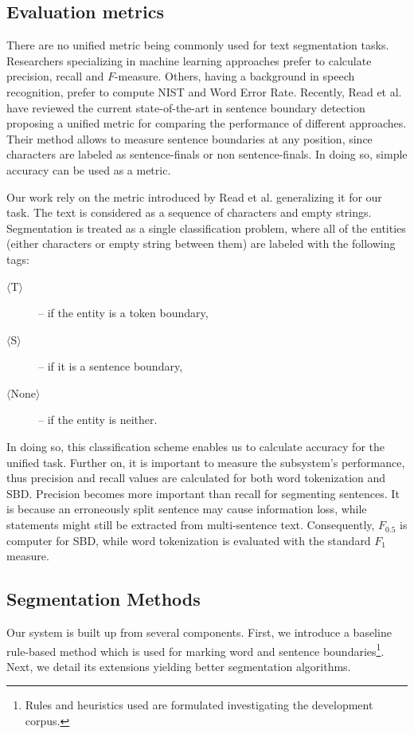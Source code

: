 \subsection{Evaluation metrics}

There are no unified metric being commonly used for text segmentation tasks.
Researchers specializing in machine learning approaches prefer to calculate precision, recall and $F$-measure.
Others, having a  background in speech recognition, prefer to compute NIST and Word Error Rate. 
Recently, Read et al. have reviewed \cite{read2012sentence} the current state-of-the-art in sentence boundary detection proposing a unified metric for comparing the performance of different approaches. 
Their method allows to measure sentence boundaries at any position, since characters are labeled as sentence-finals or non sentence-finals. In doing so, simple accuracy can be used as a metric. 

Our work rely on the metric introduced by Read et al. generalizing it for our task. The text is considered as a sequence of characters and empty strings. Segmentation is treated as a single classification problem, where all of the entities (either characters or empty string between them) are labeled with the following tags: 
\begin{description}
 \item[$\langle$T$\rangle$] --  if the entity is a token boundary,
 \item[$\langle$S$\rangle$] -- if it is a sentence boundary,
 \item[$\langle$None$\rangle$] -- if the entity is neither.
\end{description}
In doing so, this classification scheme enables us to calculate accuracy for the unified task. 
Further on, it is important to measure the subsystem's performance, thus precision and recall values are calculated for both word tokenization and SBD. 
Precision becomes more important than recall for segmenting sentences. It is because
an erroneously split sentence may cause information loss\label{sec:loss}, while statements might still be extracted from multi-sentence text. 
Consequently, $F_{0.5}$ is computer for SBD, while word tokenization is evaluated with the standard $F_1$ measure. 

\subsection{Segmentation Methods}

Our system is built up from several components. 
First, we introduce a baseline rule-based method which is used for marking word and sentence boundaries\footnote{Rules and heuristics used are formulated investigating the development corpus.}. 
Next, we detail its extensions yielding better segmentation algorithms. %

